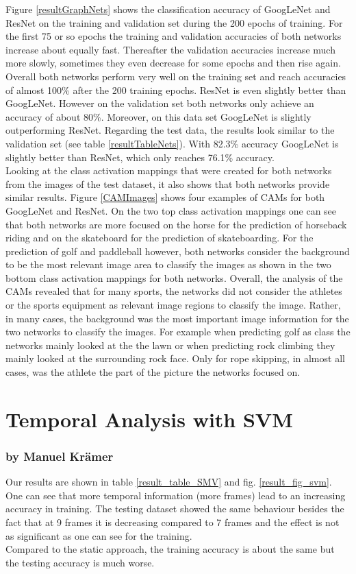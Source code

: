 \documentclass[11pt]{report}
\begin{document}
Figure \ref{resultGraphNets} shows the classification accuracy of GoogLeNet and
ResNet on the training and validation set during the 200 epochs of training.
For the first 75 or so epochs the training
and validation accuracies of both networks increase about equally fast.
Thereafter the validation accuracies increase much more slowly, sometimes they
even decrease for some epochs and then rise again. Overall both networks perform
very well on the training set and reach accuracies of almost 100\% after the 200
training epochs.
ResNet is even slightly better than GoogLeNet. However on the validation set
both networks only achieve an accuracy of about 80\%. Moreover, on this data
set GoogLeNet is slightly outperforming ResNet. Regarding the test data, the
results look similar to the validation set (see table \ref{resultTableNets}).
With 82.3\% accuracy GoogLeNet is slightly better than ResNet, which only
reaches 76.1\% accuracy. \\
Looking at the class activation mappings that were created for both networks from the images of the
test dataset, it also shows that both networks provide similar results. Figure
\ref{CAMImages} shows four examples of CAMs for both GoogLeNet and ResNet. On
the two top class activation mappings one can see that both networks are more
focused on the horse for the prediction of horseback riding and on the
skateboard for the prediction of skateboarding. For the prediction of golf and
paddleball however, both networks consider the background to be the most
relevant image area to classify the images as shown in the two bottom class
activation mappings for both networks. Overall, the analysis of the CAMs
revealed that for many sports, the networks did not consider the athletes or the
sports equipment as relevant image regions to classify the image. Rather, in
many cases, the background was the most important image information for the two
networks to classify the images. For example when predicting golf as class the
networks mainly looked at the the lawn or when predicting rock climbing they
mainly looked at the surrounding rock face. Only for rope skipping, in almost
all cases, was the athlete the part of the picture the networks focused on.

\section{Temporal Analysis with SVM}
\subsubsection{by Manuel Krämer}
Our results are shown in table \ref{result_table_SMV} and fig. \ref{result_fig_svm}.
One can see that more temporal information (more frames) lead to an increasing accuracy in training. The testing dataset showed the same behaviour besides the fact that at 9 frames it is decreasing compared to 7 frames and the effect is not as significant as one can see for the training.\\
Compared to the static approach, the training accuracy is about the same but the testing accuracy is much worse.
\end{document}
